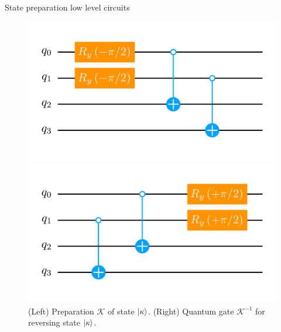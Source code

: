 \documentclass[9pt, handout, aspectratio=169]{beamer}	%
\begin{document}
\begin{frame}[allowframebreaks]{State preparation low level circuits}
	\begin{figure}[!p]
		\centering
		\begin{minipage}[c]{.45\linewidth}
			\centering
			\includegraphics[width=\linewidth]{Figures/NJL1-model-solving/ansatz-implementation-base-state-preparation-kappa}
		\end{minipage}
	  \hspace{.025\linewidth}
		\begin{minipage}[c]{.45\linewidth}
			\centering
			\includegraphics[width=\linewidth]{Figures/NJL1-model-solving/ansatz-implementation-base-state-reversing-kappa}
		\end{minipage}
		\caption{(Left) Preparation $\mathcal{K}$ of state $\ket{\kappa}$. (Right) Quantum gate $\mathcal{K}^{-1}$ for reversing state $\ket{\kappa}$.}
	\end{figure}


\end{frame}

\end{document}
